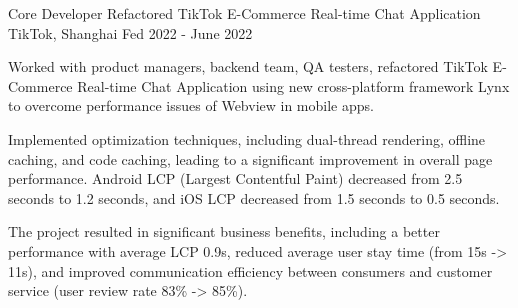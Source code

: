 \begin{cventries}
\cventry
    {Core Developer}
    {Refactored TikTok E-Commerce Real-time Chat Application}
    {TikTok, Shanghai}
    {Fed 2022 - June 2022}
    {
        \begin{cvitems}
        \item Worked with product managers, backend team, QA testers, refactored TikTok E-Commerce Real-time Chat Application using new cross-platform framework Lynx to overcome performance issues of Webview in mobile apps.
        \item Implemented optimization techniques, including dual-thread rendering, offline caching, and code caching, leading to a significant improvement in overall page performance. Android LCP (Largest Contentful Paint) decreased from 2.5 seconds to 1.2 seconds, and iOS LCP decreased from 1.5 seconds to 0.5 seconds.
        \item The project resulted in significant business benefits, including a better performance with average LCP 0.9s, reduced average user stay time (from 15s -> 11s), and improved communication efficiency between consumers and customer service (user review rate 83\% -> 85\%).
        \end{cvitems}
    }




\end{cventries}
